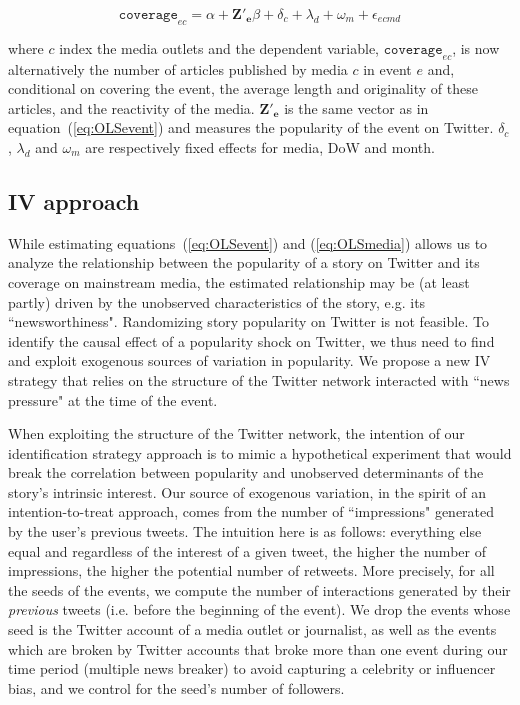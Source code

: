 \begin{equation}
\mathtt{coverage}_{ec}= \alpha + \mathbf{Z'_{e}}\beta +  \delta_{c}  + \lambda_d + \omega_m +\epsilon_{ecmd}
\label{eq:OLSmedia}
\end{equation}

\noindent where $c$ index the media outlets and the dependent variable, $\mathtt{coverage}_{ec}$, is now alternatively the number of articles published by media $c$ in event $e$ and, conditional on covering the event, the average length and originality of these articles, and the reactivity of the media. $\mathbf{Z'_{e}}$ is the same vector as in equation~(\ref{eq:OLSevent}) and measures the popularity of the event on Twitter. $\delta_{c}$,  $\lambda_d$ and $\omega_m$ are respectively fixed effects for media, DoW and month.



\subsection{IV approach\label{Sec:SpecificationIV}}

While estimating equations~(\ref{eq:OLSevent}) and (\ref{eq:OLSmedia}) allows us to analyze the relationship between the popularity of a story on Twitter and its coverage on mainstream media, the estimated relationship may be (at least partly) driven by the unobserved characteristics of the story, e.g. its ``newsworthiness". Randomizing story popularity on Twitter is not feasible. To identify the causal effect of a popularity shock on Twitter, we thus need to find and exploit exogenous sources of variation in popularity. We propose a new IV strategy that relies on the structure of the Twitter network interacted with ``news pressure" at the time of the event.

When exploiting the structure of the Twitter network, the intention of our identification strategy approach is to mimic a hypothetical experiment that would break the correlation between popularity and unobserved determinants of the story's intrinsic interest. Our source of exogenous variation, in the spirit of an intention-to-treat approach, comes from the number of ``impressions" generated by the user's previous tweets. The intuition here is as follows: everything else equal and regardless of the interest of a given tweet, the higher the number of impressions, the higher the potential number of retweets. More precisely, for all the seeds of the events, we compute the number of interactions generated by their \textit{previous} tweets (i.e. before the beginning of the event). We drop the events whose seed is the Twitter account of a media outlet or journalist, as well as the events which are broken by Twitter accounts that broke more than one event during our time period (multiple news breaker) to avoid capturing a celebrity or influencer bias, and we control for the seed's number of followers.

